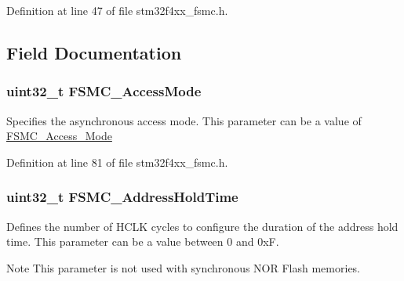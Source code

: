 Definition at line 47 of file stm32f4xx\-\_\-fsmc.\-h.



\subsection{Field Documentation}
\hypertarget{struct_f_s_m_c___n_o_r_s_r_a_m_timing_init_type_def_a11e5eff4e9915ddeac992c283094ae37}{
\subsubsection[{F\-S\-M\-C\-\_\-\-Access\-Mode}]{\setlength{\rightskip}{0pt plus 5cm}uint32\-\_\-t F\-S\-M\-C\-\_\-\-Access\-Mode}}\label{struct_f_s_m_c___n_o_r_s_r_a_m_timing_init_type_def_a11e5eff4e9915ddeac992c283094ae37}
Specifies the asynchronous access mode. This parameter can be a value of \hyperlink{group___f_s_m_c___access___mode}{F\-S\-M\-C\-\_\-\-Access\-\_\-\-Mode} 

Definition at line 81 of file stm32f4xx\-\_\-fsmc.\-h.

\hypertarget{struct_f_s_m_c___n_o_r_s_r_a_m_timing_init_type_def_ae220905040829fa65a833ddbae7fa119}{
\subsubsection[{F\-S\-M\-C\-\_\-\-Address\-Hold\-Time}]{\setlength{\rightskip}{0pt plus 5cm}uint32\-\_\-t F\-S\-M\-C\-\_\-\-Address\-Hold\-Time}}\label{struct_f_s_m_c___n_o_r_s_r_a_m_timing_init_type_def_ae220905040829fa65a833ddbae7fa119}
Defines the number of H\-C\-L\-K cycles to configure the duration of the address hold time. This parameter can be a value between 0 and 0x\-F. \begin{DoxyNote}{Note}
This parameter is not used with synchronous N\-O\-R Flash memories. 
\end{DoxyNote}


